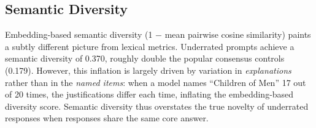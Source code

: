 \begin{table}[t]
    \centering
    \caption{The ten most converged underrated prompts across all three models (60 samples each). Frequency is the proportion of responses naming the top answer. These items are widely cited as ``underrated'' in online discourse.}
    \label{tab:top_converged}
\end{table}

\subsection{Semantic Diversity}
\label{sec:semantic}

Embedding-based semantic diversity (1 $-$ mean pairwise cosine similarity) paints a subtly different picture from lexical metrics. Underrated prompts achieve a semantic diversity of 0.370, roughly double the popular consensus controls (0.179). However, this inflation is largely driven by variation in \emph{explanations} rather than in the \emph{named items}: when a model names ``Children of Men'' 17 out of 20 times, the justifications differ each time, inflating the embedding-based diversity score. Semantic diversity thus overstates the true novelty of underrated responses when responses share the same core answer.

